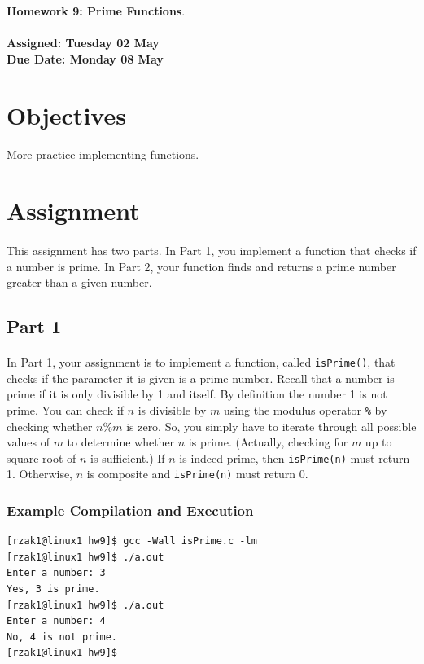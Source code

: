 \documentclass[letter,11pt]{article}
\begin{document}
\huge
\textbf{Homework 9: Prime Functions}.
\normalsize
\\ ~~ \\
\textbf{Assigned: Tuesday 02 May} \\
\textbf{Due Date: Monday 08 May}

\section*{Objectives}
\paragraph{}More practice implementing functions.

\section*{Assignment}
\paragraph{}This assignment has two parts. In Part 1, you implement a function that checks if a number is prime. In Part 2, your function finds and returns a prime number greater than a given number.

\subsection*{Part 1}
\paragraph{}In Part 1, your assignment is to implement a function, called \texttt{isPrime()}, that checks if the parameter it is given is a prime number. Recall that a number is prime if it is only divisible by 1 and itself. By definition the number 1 is not prime. You can check if $n$ is divisible by $m$ using the modulus operator \texttt{\%} by checking whether $n \% m$ is zero. So, you simply have to iterate through all possible values of $m$ to determine whether $n$ is prime. (Actually, checking for $m$ up to square root of $n$ is sufficient.) If $n$ is indeed prime, then \texttt{isPrime(n)} must return 1. Otherwise, $n$ is composite and \texttt{isPrime(n)} must return 0.

\subsubsection*{Example Compilation and Execution}
\begin{verbatim}
[rzak1@linux1 hw9]$ gcc -Wall isPrime.c -lm
[rzak1@linux1 hw9]$ ./a.out
Enter a number: 3
Yes, 3 is prime.
[rzak1@linux1 hw9]$ ./a.out
Enter a number: 4
No, 4 is not prime.
[rzak1@linux1 hw9]$
\end{verbatim}
\end{document}
